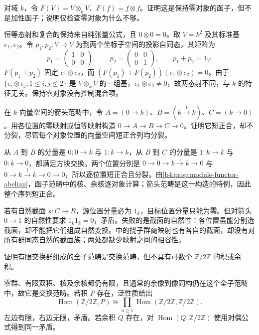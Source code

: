\begin{exercise}\label{b4:ex:04-nonadditive-tensor-square}
	对域 \(k\)，令 \(F(V)=V\otimes_k V\)、\(F(f)=f\otimes f\)。证明这是保持零对象的函子，但不是加性函子；说明仅检查零对象为什么不够。
\end{exercise}
\begin{solution}
	恒等态射和复合的保持来自纯张量公式，且 \(0\otimes0=0\)。取 \(V=k^2\) 及其标准基 \(e_1,e_2\)。令 \(p_1,p_2:V\to V\) 为到两个坐标子空间的投影自同态，其矩阵为
	\[
		p_1=\begin{pmatrix}1&0\\0&0\end{pmatrix},\qquad
		p_2=\begin{pmatrix}0&0\\0&1\end{pmatrix},\qquad p_1+p_2=1_V.
	\]
	\(F(p_1+p_2)\) 固定 \(e_1\otimes e_2\)，而 \((F(p_1)+F(p_2))(e_1\otimes e_2)=0\)。由于 \(\{e_i\otimes e_j:1\le i,j\le2\}\) 是 \(V\otimes_kV\) 的一组基，\(e_1\otimes e_2\ne0\)，故两态射不同，与 \(k\) 的特征无关。保持零对象没有控制混合项。
\end{solution}

\begin{exercise}\label{b4:ex:04-arrow-nonsplit}
	在 \(k\)-向量空间的箭头范畴中，令 \(A=(0\to k)\)、\(B=(k\xrightarrow1 k)\)、\(C=(k\to0)\)。用各位置的零映射或恒等映射构造 \(0\to A\to B\to C\to0\)。证明它短正合，却不分裂，尽管每个对象位置的向量空间短正合列均分裂。
\end{exercise}
\begin{solution}
	从 \(A\) 到 \(B\) 的分量是 \(0:0\to k\) 与 \(1:k\to k\)，从 \(B\) 到 \(C\) 的分量是 \(1:k\to k\) 与 \(0:k\to0\)，都满足方块交换。两个位置分别是 \(0\to0\to k\xrightarrow1k\to0\) 与 \(0\to k\xrightarrow1k\to0\to0\)，所以逐位置短正合且分裂。由\cref{b4:prop:module-functor-abelian}，函子范畴中的核、余核逐对象计算；箭头范畴是这一构造的特例，因此整个序列短正合。

	若有自然截面 \(s:C\to B\)，源位置分量必为 \(1_k\)，目标位置分量只能为零。但对箭头 \(0\to1\) 的自然性要求 \(1_k1_k=0\)，矛盾。失败的是截面的自然性：各位置虽能分别选截面，却不能把它们组成自然变换。中的挠子群商映射也有各自的截面，却没有对所有群同态自然的截面族；两处都缺少映射之间的相容性。
\end{solution}

\begin{exercise}\label{b4:ex:04-finite-abelian-category}
	证明有限交换群组成的全子范畴是交换范畴，但不具有可数个 \(\mathbb Z/2\mathbb Z\) 的积或余积。
\end{exercise}
\begin{solution}
	零群、有限双积、核及余核都仍有限，且通常的余像到像同构仍在这个全子范畴中，故它是交换范畴。若积 \(P\) 存在，泛性质给出
	\[
		\operatorname{Hom}(\mathbb Z/2\mathbb Z,P)\cong \prod_{n\geq1}\operatorname{Hom}(\mathbb Z/2\mathbb Z,\mathbb Z/2\mathbb Z).
	\]
	左边有限，右边无限，矛盾。若余积 \(Q\) 存在，对 \(\operatorname{Hom}(Q,\mathbb Z/2\mathbb Z)\) 使用对偶公式得到同一矛盾。
\end{solution}

